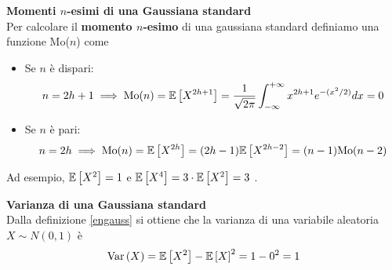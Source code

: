 \begin{defn}
    \label{engauss}
    \textbf{Momenti $n$-esimi di una Gaussiana standard} \\
    Per calcolare il \textbf{momento $n$-esimo} di una gaussiana standard
    definiamo una funzione Mo($n$) come

    \begin{itemize}
        \item Se $n$ è dispari:
        \begin{equation*}
            \begin{aligned}
                n = 2h + 1 \implies \text{Mo}(n) = \mathbb{E}\left[X^{2h+1}\right] = \frac{1}{\sqrt{2 \pi}}
                \int_{-\infty}^{+\infty} x^{2h+1} e^{-(x^2/2)} dx = 0
            \end{aligned}
        \end{equation*}
        \item Se $n$ è pari:
        \begin{equation*}
            \begin{aligned}
                n = 2h \implies \text{Mo}(n) = \mathbb{E}\left[X^{2h}\right] = (2h-1) \mathbb{E}\left[X^{2h-2}\right] = (n-1) \text{Mo}(n-2)
            \end{aligned}
        \end{equation*}
    \end{itemize}

    Ad esempio, $\mathbb{E}\left[X^2\right] = 1$ e $\mathbb{E}\left[X^4\right] = 3 \cdot \mathbb{E}\left[X^2\right] = 3$ .
\end{defn}

\begin{defn}
    \textbf{Varianza di una Gaussiana standard} \\
    Dalla definizione \ref{engauss} si ottiene che la varianza di una variabile
    aleatoria $X \sim N(0,1)$ è
    \begin{equation*}
        \begin{aligned}
            \text{Var}\left(X\right) = \mathbb{E}\left[X^2\right] - \mathbb{E}\left[X\right]^2 = 1 - 0^2 = 1
        \end{aligned}
    \end{equation*}
\end{defn}


